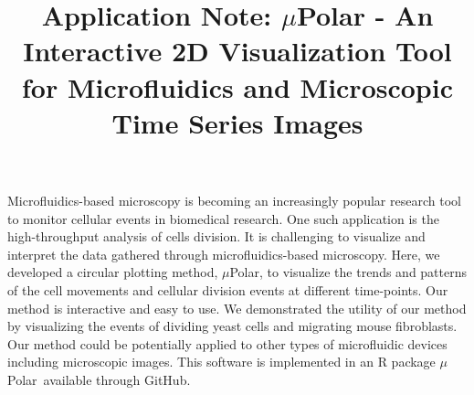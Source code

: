 \documentclass[conference]{IEEEtran}
\begin{document}
\title{ Application Note: $\mu$Polar \-- An Interactive 2D Visualization Tool for  Microfluidics and  Microscopic Time Series Images }


\maketitle


\begin{Summary}

Microfluidics-based microscopy is becoming an increasingly popular research tool to monitor cellular events in biomedical research. One such application is the high-throughput analysis of cells division. It is challenging to visualize and interpret the data gathered through microfluidics-based microscopy. Here, we developed a circular plotting method, $\mu$Polar, to visualize the trends and patterns of the cell movements and cellular division events at different time-points. Our method is interactive and easy to use. We demonstrated the utility of our method by visualizing the events of dividing yeast cells and migrating mouse fibroblasts. Our method could be potentially applied to other types of microfluidic devices including microscopic images. This software is implemented in an R package $\mu$Polar\ available through GitHub.


\end{Summary}
\end{document}
